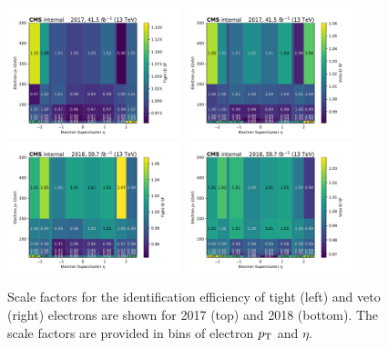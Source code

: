 \begin{figure}[ht!]
  \begin{center}
    \includegraphics[width=0.45\textwidth]{ScaleFactors/Electron/electron_id_tight_2017.pdf}
    \includegraphics[width=0.45\textwidth]{ScaleFactors/Electron/electron_id_veto_2017.pdf} \\
    \includegraphics[width=0.45\textwidth]{ScaleFactors/Electron/electron_id_tight_2018.pdf}
    \includegraphics[width=0.45\textwidth]{ScaleFactors/Electron/electron_id_veto_2018.pdf}
    \caption{
      Scale factors for the identification efficiency of tight (left) and veto (right) electrons are shown for 2017 (top) and
      2018 (bottom). The scale factors are provided in bins of electron $p_{\textrm{T}}$ and $\eta$.
    }
    \label{fig:sf_electron_id}
  \end{center}
\end{figure}

